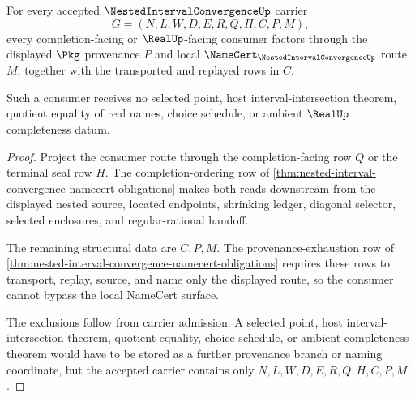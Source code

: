 \begin{theorem}
\label{thm:nested-interval-convergence-provenance-exhaustion}
For every accepted $\NestedIntervalConvergenceUp$ carrier
$$
G=(N,L,W,D,E,R,Q,H,C,P,M),
$$
every completion-facing or $\RealUp$-facing consumer factors through the displayed $\Pkg$ provenance $P$ and local $\NameCert_{\NestedIntervalConvergenceUp}$ route $M$, together with the transported and replayed rows in $C$.

Such a consumer receives no selected point, host interval-intersection theorem, quotient equality of real names, choice schedule, or ambient $\RealUp$ completeness datum.
\end{theorem}
\begin{proof}
Project the consumer route through the completion-facing row $Q$ or the terminal seal row $H$. The completion-ordering row of \autoref{thm:nested-interval-convergence-namecert-obligations} makes both reads downstream from the displayed nested source, located endpoints, shrinking ledger, diagonal selector, selected enclosures, and regular-rational handoff.

The remaining structural data are $C,P,M$. The provenance-exhaustion row of \autoref{thm:nested-interval-convergence-namecert-obligations} requires these rows to transport, replay, source, and name only the displayed route, so the consumer cannot bypass the local NameCert surface.

The exclusions follow from carrier admission. A selected point, host interval-intersection theorem, quotient equality, choice schedule, or ambient completeness theorem would have to be stored as a further provenance branch or naming coordinate, but the accepted carrier contains only $N,L,W,D,E,R,Q,H,C,P,M$.
\end{proof}


